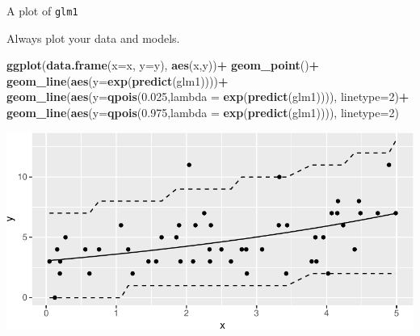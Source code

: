 \documentclass[
  ignorenonframetext,
]{beamer}
\newenvironment{Shaded}{\begin{snugshade}}{\end{snugshade}}
\newcommand{\DataTypeTok}[1]{\textcolor[rgb]{0.13,0.29,0.53}{#1}}
\newcommand{\DecValTok}[1]{\textcolor[rgb]{0.00,0.00,0.81}{#1}}
\newcommand{\FloatTok}[1]{\textcolor[rgb]{0.00,0.00,0.81}{#1}}
\newcommand{\KeywordTok}[1]{\textcolor[rgb]{0.13,0.29,0.53}{\textbf{#1}}}
\newcommand{\NormalTok}[1]{#1}
\newcommand{\OperatorTok}[1]{\textcolor[rgb]{0.81,0.36,0.00}{\textbf{#1}}}
\newcommand{\StringTok}[1]{\textcolor[rgb]{0.31,0.60,0.02}{#1}}
\begin{document}
\begin{frame}[fragile]{A plot of \texttt{glm1}}
\protect\hypertarget{a-plot-of-glm1}{}

Always plot your data and models. \scriptsize

\begin{Shaded}
\begin{Highlighting}[]
\KeywordTok{ggplot}\NormalTok{(}\KeywordTok{data.frame}\NormalTok{(}\DataTypeTok{x=}\NormalTok{x, }\DataTypeTok{y=}\NormalTok{y), }\KeywordTok{aes}\NormalTok{(x,y))}\OperatorTok{+}
\StringTok{  }\KeywordTok{geom_point}\NormalTok{()}\OperatorTok{+}
\StringTok{  }\KeywordTok{geom_line}\NormalTok{(}\KeywordTok{aes}\NormalTok{(}\DataTypeTok{y=}\KeywordTok{exp}\NormalTok{(}\KeywordTok{predict}\NormalTok{(glm1))))}\OperatorTok{+}
\StringTok{  }\KeywordTok{geom_line}\NormalTok{(}\KeywordTok{aes}\NormalTok{(}\DataTypeTok{y=}\KeywordTok{qpois}\NormalTok{(}\FloatTok{0.025}\NormalTok{,}\DataTypeTok{lambda =} \KeywordTok{exp}\NormalTok{(}\KeywordTok{predict}\NormalTok{(glm1)))), }\DataTypeTok{linetype=}\DecValTok{2}\NormalTok{)}\OperatorTok{+}
\StringTok{  }\KeywordTok{geom_line}\NormalTok{(}\KeywordTok{aes}\NormalTok{(}\DataTypeTok{y=}\KeywordTok{qpois}\NormalTok{(}\FloatTok{0.975}\NormalTok{,}\DataTypeTok{lambda =} \KeywordTok{exp}\NormalTok{(}\KeywordTok{predict}\NormalTok{(glm1)))), }\DataTypeTok{linetype=}\DecValTok{2}\NormalTok{)}
\end{Highlighting}
\end{Shaded}

\includegraphics{likelihood_files/figure-beamer/unnamed-chunk-9-1.pdf}

\end{frame}
\end{document}
